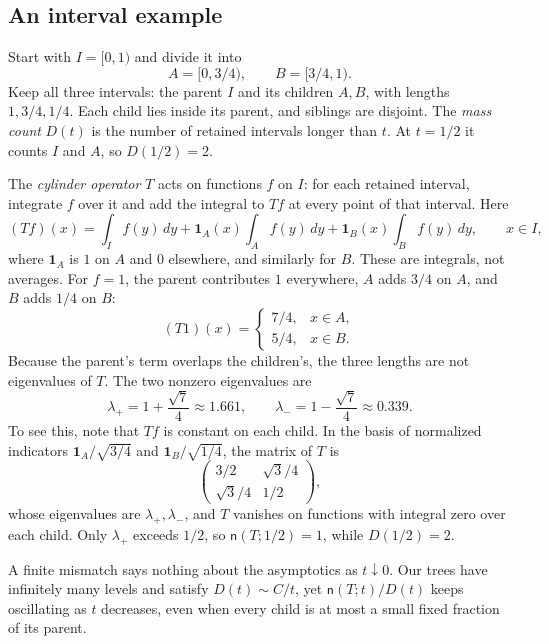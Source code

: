 \documentclass[11pt]{article}
\theoremstyle{definition}
\theoremstyle{remark}
\newcommand{\one}{\mathbf 1}
\newcommand{\ncount}{\mathsf n}
\begin{document}
\subsection{An interval example}\label{sec:example}
Start with $I=[0,1)$ and divide it into
\[
 A=[0,3/4),\qquad B=[3/4,1).
\]
Keep all three intervals: the parent $I$ and its children $A,B$, with
lengths $1,3/4,1/4$. Each child lies inside its parent, and siblings are
disjoint. The \emph{mass count} $D(t)$ is the number of retained
intervals longer than $t$. At $t=1/2$ it counts $I$ and $A$, so
$D(1/2)=2$.

The \emph{cylinder operator} $T$ acts on functions $f$ on $I$: for each
retained interval, integrate $f$ over it and add the integral to $Tf$ at
every point of that interval. Here
\begin{equation}\label{eq:toy-operator}
 (Tf)(x)=\int_I f(y)\,dy
       +\one_A(x)\int_A f(y)\,dy
       +\one_B(x)\int_B f(y)\,dy,
 \qquad x\in I,
\end{equation}
where $\one_A$ is $1$ on $A$ and $0$ elsewhere, and similarly for $B$.
These are integrals, not averages. For $f=1$, the parent contributes $1$
everywhere, $A$ adds $3/4$ on $A$, and $B$ adds $1/4$ on $B$:
\[
 (T1)(x)=
 \begin{cases}7/4,&x\in A,\\5/4,&x\in B.\end{cases}
\]
Because the parent's term overlaps the children's, the three lengths are
not eigenvalues of $T$. The two nonzero eigenvalues are
\[
 \lambda_+=1+\frac{\sqrt7}{4}\approx1.661,
 \qquad \lambda_-=1-\frac{\sqrt7}{4}\approx0.339.
\]
To see this, note that $Tf$ is constant on each child. In the basis of
normalized indicators $\one_A/\sqrt{3/4}$ and $\one_B/\sqrt{1/4}$, the
matrix of $T$ is
\[
 \begin{pmatrix}3/2&\sqrt3/4\\\sqrt3/4&1/2\end{pmatrix},
\]
whose eigenvalues are $\lambda_+,\lambda_-$, and $T$ vanishes on
functions with integral zero over each child. Only $\lambda_+$ exceeds
$1/2$, so $\ncount(T;1/2)=1$, while $D(1/2)=2$.

A finite mismatch says nothing about the asymptotics as
$t\downarrow0$. Our trees have infinitely many levels and satisfy
$D(t)\sim C/t$, yet $\ncount(T;t)/D(t)$ keeps oscillating as $t$
decreases, even when every child is at most a small fixed fraction of
its parent.
\end{document}
